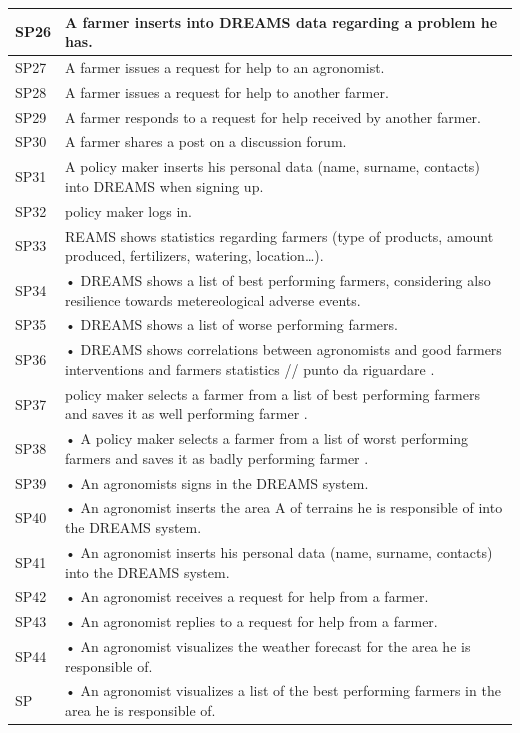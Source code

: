 \documentclass{article}
\begin{document}
\begin{longtable}[c]{|m{0.75cm}|m{11cm}|}
 \hline
 SP26 & A farmer inserts into DREAMS data regarding a problem he has.\\
 \hline
 SP27 & A farmer issues a request for help to an agronomist.\\
 \hline
 SP28 & A farmer issues a request for help to another farmer.\\
 \hline
 SP29 & A farmer responds to a request for help received by another farmer.\\
 \hline
 SP30 & A farmer shares a post on a discussion forum.\\
 \hline
 SP31 & A policy maker inserts his personal data (name, surname, contacts)  into DREAMS when signing up.\\
 \hline
 SP32 & policy maker logs in.\\
 \hline
 SP33 & REAMS shows statistics regarding farmers (type of products, amount produced, fertilizers, watering, location…).\\
 \hline
 SP34 & •	DREAMS shows a list of best performing farmers, considering also resilience towards metereological adverse events.\\
 \hline
 SP35 & •	DREAMS shows a list of worse performing farmers.\\
 \hline
 SP36 & •	DREAMS shows correlations between agronomists and good farmers interventions and farmers statistics // punto da riguardare .\\
 \hline
 SP37 &  policy maker selects a farmer from a list of best performing farmers and saves it as well performing farmer .\\
 \hline
 SP38 & •	A policy maker selects a farmer from a list of worst performing farmers and saves it as badly performing farmer .\\
 \hline
 SP39 & •	An agronomists signs in the DREAMS system.\\
 \hline
 SP40 & •	An agronomist inserts the area A of terrains he is responsible of into the DREAMS system.\\
 \hline
 SP41 & •	An agronomist inserts his personal data (name, surname, contacts) into the DREAMS system.\\
 \hline
 SP42 & •	An agronomist receives a request for help from a farmer.\\
 \hline
 SP43 & •	An agronomist replies to a request for help from a farmer.\\
 \hline
 SP44 & •	An agronomist visualizes the weather forecast for the area he is responsible of.\\
 \hline
 SP & •	An agronomist visualizes a list of the best performing farmers in the area he is responsible of.\\

\end{longtable}
\end{document}
